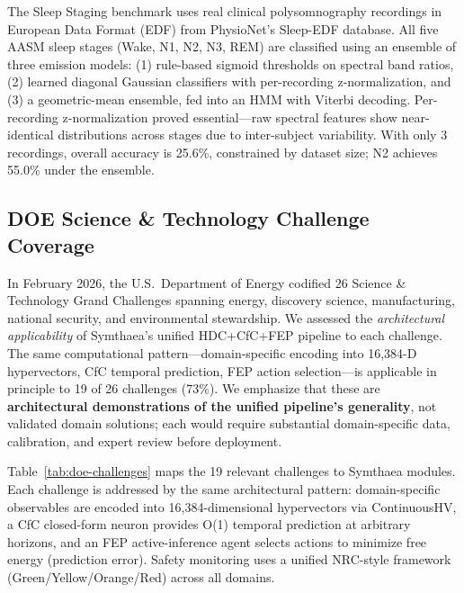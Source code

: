 \documentclass[10pt,letterpaper]{article}
\begin{document}
The Sleep Staging benchmark uses real clinical polysomnography recordings in European Data Format (EDF) from PhysioNet's Sleep-EDF database.
All five AASM sleep stages (Wake, N1, N2, N3, REM) are classified using an ensemble of three emission models: (1) rule-based sigmoid thresholds on spectral band ratios, (2) learned diagonal Gaussian classifiers with per-recording z-normalization, and (3) a geometric-mean ensemble, fed into an HMM with Viterbi decoding.
Per-recording z-normalization proved essential---raw spectral features show near-identical distributions across stages due to inter-subject variability.
With only 3 recordings, overall accuracy is 25.6\%, constrained by dataset size; N2 achieves 55.0\% under the ensemble.

\subsection{DOE Science \& Technology Challenge Coverage}

In February 2026, the U.S.\ Department of Energy codified 26 Science \& Technology Grand Challenges spanning energy, discovery science, manufacturing, national security, and environmental stewardship. We assessed the \emph{architectural applicability} of Symthaea's unified HDC+CfC+FEP pipeline to each challenge. The same computational pattern---domain-specific encoding into 16,384-D hypervectors, CfC temporal prediction, FEP action selection---is applicable in principle to 19 of 26 challenges (73\%). We emphasize that these are \textbf{architectural demonstrations of the unified pipeline's generality}, not validated domain solutions; each would require substantial domain-specific data, calibration, and expert review before deployment.

Table~\ref{tab:doe-challenges} maps the 19 relevant challenges to Symthaea modules. Each challenge is addressed by the same architectural pattern: domain-specific observables are encoded into 16,384-dimensional hypervectors via ContinuousHV, a CfC closed-form neuron provides O(1) temporal prediction at arbitrary horizons, and an FEP active-inference agent selects actions to minimize free energy (prediction error). Safety monitoring uses a unified NRC-style framework (Green/Yellow/Orange/Red) across all domains.
\end{document}
